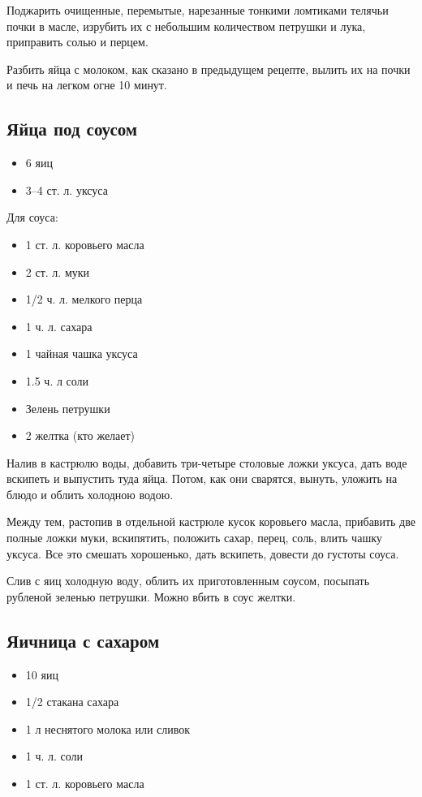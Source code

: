 Поджарить очищенные, перемытые, нарезанные тонкими ломтиками телячьи почки в масле, изрубить их с небольшим количеством петрушки и лука, приправить солью и перцем.

Разбить яйца с молоком, как сказано в предыдущем рецепте, вылить их на почки и печь на легком огне 10 минут.

\subsection{Яйца под соусом}

\begin{itemize}
	\item 6 яиц 
    \item 3–4 ст. л. уксуса
\end{itemize}

Для соуса: 

\begin{itemize}
	\item 1 ст. л. коровьего масла 
    \item 2 ст. л. муки 
    \item 1/2 ч. л. мелкого перца 
    \item 1 ч. л. сахара 
    \item 1 чайная чашка уксуса 
    \item 1.5 ч. л соли 
    \item Зелень петрушки 
    \item 2 желтка (кто желает)
\end{itemize}

Налив в кастрюлю воды, добавить три-четыре столовые ложки уксуса, дать воде вскипеть и выпустить туда яйца. Потом, как они сварятся, вынуть, уложить на блюдо и облить холодною водою.

Между тем, растопив в отдельной кастрюле кусок коровьего масла, прибавить две полные ложки муки, вскипятить, положить сахар, перец, соль, влить чашку уксуса. Все это смешать хорошенько, дать вскипеть, довести до густоты соуса.

Слив с яиц холодную воду, облить их приготовленным соусом, посыпать рубленой зеленью петрушки. Можно вбить в соус желтки.

\subsection{Яичница с сахаром}

\begin{itemize}
	\item 10 яиц 
    \item 1/2 стакана сахара 
    \item 1 л неснятого молока или сливок 
    \item 1 ч. л. соли 
    \item 1 ст. л. коровьего масла
\end{itemize}

